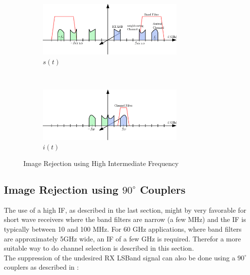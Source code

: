 \begin{figure}[h!]
  \centering
  \begin{subfigure}{\textwidth}
    \centering
    \includegraphics[width=0.8\textwidth]{figures/rx_rf_0_freq_s}
    \caption{$s(t)$}
    \label{fig:rx_rf_0_freq_s}
  \end{subfigure}
  \vspace{4ex} \\
  \begin{subfigure}{\textwidth}
    \centering
    \includegraphics[width=0.8\textwidth]{figures/rx_rf_0_freq_i}
    \caption{$i(t)$}
    \label{fig:rx_rf_0_freq_i}
  \end{subfigure}
  \caption{Image Rejection using High Intermediate Frequency}
  \label{fig:rx_rf_0_freq}
\end{figure}

\subsection{Image Rejection using $90^\circ$ Couplers}
\label{sec:rx_rf_1}
The use of a high \gls{IF}, as described in the last section, might
by very favorable for short wave receivers where the band filters
are narrow (a few MHz) and the \gls{IF} is typically between 10 and 100 MHz.
For 60 GHz applications, where band filters are approximately 5GHz wide,
an \gls{IF} of a few GHz is required.
Therefor a more suitable way to do channel selection is described in this
section. \\

The suppression of the undesired \gls{RX} \gls{LSBand} signal can also be done
using a $90^\circ$ couplers as described in : \\

